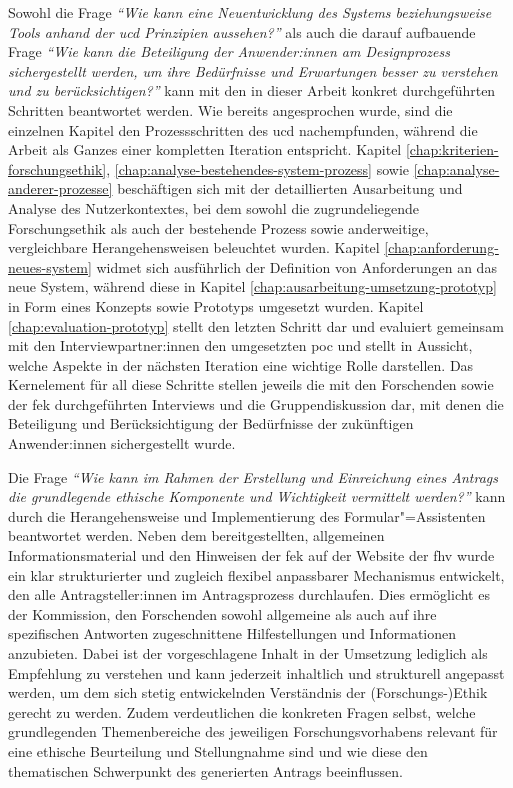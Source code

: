 \documentclass[a4paper,12pt,twoside,numbers=noendperiod]{scrreprt}
\begin{document}
Sowohl die Frage \textit{\enquote{Wie kann eine Neuentwicklung des Systems beziehungsweise Tools anhand der \acl{ucd} Prinzipien aussehen?}} als auch die darauf aufbauende Frage \textit{\enquote{Wie kann die Beteiligung der Anwender:innen am Designprozess sichergestellt werden, um ihre Bedürfnisse und Erwartungen besser zu verstehen und zu berücksichtigen?}} kann mit den in dieser Arbeit konkret durchgeführten Schritten beantwortet werden. Wie bereits angesprochen wurde, sind die einzelnen Kapitel den Prozessschritten des \ac{ucd} nachempfunden, während die Arbeit als Ganzes einer kompletten Iteration entspricht. Kapitel \ref{chap:kriterien-forschungsethik}, \ref{chap:analyse-bestehendes-system-prozess} sowie \ref{chap:analyse-anderer-prozesse} beschäftigen sich mit der detaillierten Ausarbeitung und Analyse des Nutzerkontextes, bei dem sowohl die zugrundeliegende Forschungsethik als auch der bestehende Prozess sowie anderweitige, vergleichbare Herangehensweisen beleuchtet wurden. Kapitel \ref{chap:anforderung-neues-system} widmet sich ausführlich der Definition von Anforderungen an das neue System, während diese in Kapitel \ref{chap:ausarbeitung-umsetzung-prototyp} in Form eines Konzepts sowie Prototyps umgesetzt wurden. Kapitel \ref{chap:evaluation-prototyp} stellt den letzten Schritt dar und evaluiert gemeinsam mit den Interviewpartner:innen den umgesetzten \ac{poc} und stellt in Aussicht, welche Aspekte in der nächsten Iteration eine wichtige Rolle darstellen. Das Kernelement für all diese Schritte stellen jeweils die mit den Forschenden sowie der \ac{fek} durchgeführten Interviews und die Gruppendiskussion dar, mit denen die Beteiligung und Berücksichtigung der Bedürfnisse der zukünftigen Anwender:innen sichergestellt wurde.

\medskip

Die Frage \textit{\enquote{Wie kann im Rahmen der Erstellung und Einreichung eines Antrags die grundlegende ethische Komponente und Wichtigkeit vermittelt werden?}} kann durch die Herangehensweise und Implementierung des Formular"=Assistenten beantwortet werden. Neben dem bereitgestellten, allgemeinen Informationsmaterial und den Hinweisen der \acl{fek} auf der Website der \ac{fhv} wurde ein klar strukturierter und zugleich flexibel anpassbarer Mechanismus entwickelt, den alle Antragsteller:innen im Antragsprozess durchlaufen. Dies ermöglicht es der Kommission, den Forschenden sowohl allgemeine als auch auf ihre spezifischen Antworten zugeschnittene Hilfestellungen und Informationen anzubieten. Dabei ist der vorgeschlagene Inhalt in der Umsetzung lediglich als Empfehlung zu verstehen und kann jederzeit inhaltlich und strukturell angepasst werden, um dem sich stetig entwickelnden Verständnis der (Forschungs-)Ethik gerecht zu werden. Zudem verdeutlichen die konkreten Fragen selbst, welche grundlegenden Themenbereiche des jeweiligen Forschungsvorhabens relevant für eine ethische Beurteilung und Stellungnahme sind und wie diese den thematischen Schwerpunkt des generierten Antrags beeinflussen.
\end{document}
